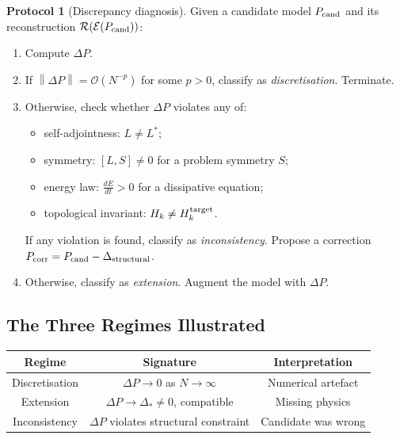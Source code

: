 \documentclass[11pt,a4paper]{article}
\theoremstyle{definition}
\newtheorem{protocol}[definition]{Protocol}
\theoremstyle{plain}
\newcommand{\Ecal}{\mathcal{E}}
\newcommand{\Rcal}{\mathcal{R}}
\newcommand{\Norm}[1]{\left\lVert #1 \right\rVert}
\begin{document}
\begin{protocol}[Discrepancy diagnosis]\label{prot:diagnosis}
Given a candidate model $P_{\rm cand}$ and its reconstruction
$\Rcal(\Ecal(P_{\rm cand}))$:
\begin{enumerate}[label=(\arabic*)]
  \item Compute $\Delta P$.
  \item If $\Norm{\Delta P} = \mathcal{O}(N^{-p})$ for some $p > 0$,
        classify as \emph{discretisation}. Terminate.
  \item Otherwise, check whether $\Delta P$ violates any of:
        \begin{itemize}
          \item self-adjointness: $L \neq L^\ast$;
          \item symmetry: $[L, S] \neq 0$ for a problem symmetry $S$;
          \item energy law: $\frac{dE}{dt} > 0$ for a dissipative
                equation;
          \item topological invariant: $H_k \neq H_k^{\rm target}$.
        \end{itemize}
        If any violation is found, classify as
        \emph{inconsistency}. Propose a correction
        $P_{\rm corr} = P_{\rm cand} - \Delta_{\rm structural}$.
  \item Otherwise, classify as \emph{extension}. Augment the model
        with $\Delta P$.
\end{enumerate}
\end{protocol}

\subsection{The Three Regimes Illustrated}

\begin{center}
\begin{tabular}{c|c|c}
  \toprule
  Regime & Signature & Interpretation \\
  \midrule
  Discretisation & $\Delta P \to 0$ as $N \to \infty$
    & Numerical artefact \\
  Extension & $\Delta P \to \Delta_\ast \neq 0$, compatible
    & Missing physics \\
  Inconsistency & $\Delta P$ violates structural constraint
    & Candidate was wrong \\
  \bottomrule
\end{tabular}
\end{center}
\end{document}
